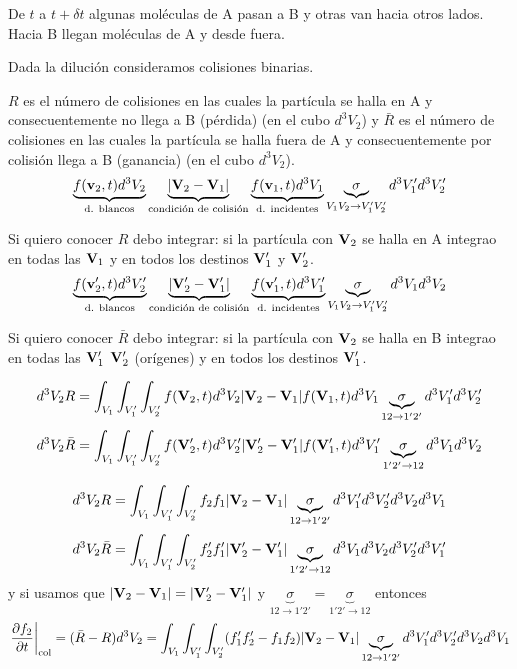 \documentclass[10pt,oneside]{CBFT_book}
\begin{document}
De $t$ a $t+\delta t$ algunas moléculas de A pasan a B y otras van hacia otros lados. Hacia B
llegan moléculas de A y desde fuera.

Dada la dilución consideramos colisiones binarias.

$R$ es el número de colisiones en las cuales la partícula se halla en A y consecuentemente no llega 
a B (pérdida) (en el cubo $d^3V_2$) y $\bar{R}$ es el número de colisiones en las cuales la partícula
se halla fuera de A y consecuentemente por colisión llega a B (ganancia) (en el cubo $d^3V_2$).
\[
	\underbrace{ f( \vb{v}_2,t ) d^3V_2 }_{\text{d. blancos}}  
	\underbrace{| \vb{V}_2 - \vb{V}_1 |}_{ \text{condición de colisión} } 
	\underbrace{ f( \vb{v}_1,t ) d^3V_1 }_{\text{d. incidentes}}  
	\underbrace{\sigma}_{ V_1V_2 \to V_1'V_2'} d^3V_1' d^3V_2'
\]

Si quiero conocer $R$ debo integrar: si la partícula con $\vb{V}_2$ se halla en A integrao en todas
las $\vb{V}_1$ y en todos los destinos $\vb{V}_1'$ y $\vb{V}_2'$.
\[
	\underbrace{ f( \vb{v}_2',t ) d^3V_2' }_{\text{d. blancos}}  
	\underbrace{| \vb{V}_2' - \vb{V}_1' |}_{ \text{condición de colisión} } 
	\underbrace{ f( \vb{v}_1',t ) d^3V_1' }_{\text{d. incidentes}}  
	\underbrace{\sigma}_{ V_1V_2 \to V_1'V_2'} d^3V_1 d^3V_2
\]

Si quiero conocer $\bar{R}$ debo integrar: si la partícula con $\vb{V}_2$ se halla en B integrao en todas
las $\vb{V}_1'$ $\vb{V}_2'$ (orígenes) y en todos los destinos $\vb{V}_1'$.

\[
	d^3V_2 R = \int_{V_1} \int_{V_1'} \int_{V_2'}  f(\vb{V}_2,t) d^3V_2 | \vb{V}_2 - \vb{V}_1 |
		f(\vb{V}_1,t) d^3V_1 \underbrace{\sigma}_{12 \to 1'2'}  d^3V_1' d^3V_2'
\]
\[
	d^3V_2 \bar{R} = \int_{V_1} \int_{V_1'} \int_{V_2'}  f(\vb{V}_2',t) d^3V_2' | \vb{V}_2' - \vb{V}_1' |
		f(\vb{V}_1',t) d^3V_1' \underbrace{\sigma}_{1'2' \to 12}  d^3V_1 d^3V_2
\]

\[
	d^3V_2 R = \int_{V_1} \int_{V_1'} \int_{V_2'}  f_2 f_1  | \vb{V}_2 - \vb{V}_1 |
		\underbrace{\sigma}_{12 \to 1'2'}  d^3V_1' d^3V_2' d^3V_2 d^3V_1
\]
\[
	d^3V_2 \bar{R} = \int_{V_1} \int_{V_1'} \int_{V_2'}  f_2' f_1' | \vb{V}_2' - \vb{V}_1' |
		 \underbrace{\sigma}_{1'2' \to 12}  d^3V_1 d^3V_2 d^3V_2' d^3V_1'
\]
y si usamos que $| \vb{V}_2 - \vb{V}_1 |=| \vb{V}_2' - \vb{V}_1' |$ y $  \underbrace{\sigma}_{12 \to 1'2'} =  
\underbrace{\sigma}_{1'2' \to 12} $ entonces 
\[
	\left. \dpar{f_2}{t}\right|_{\text{col}} =(\bar{R}-R) d^3V_2 =
	\int_{V_1} \int_{V_1'} \int_{V_2'}  ( f_1' f_2' -f_1 f_2 ) | \vb{V}_2 - \vb{V}_1 |
		\underbrace{\sigma}_{12 \to 1'2'}  d^3V_1' d^3V_2' d^3V_2 d^3V_1
\]
\end{document}
